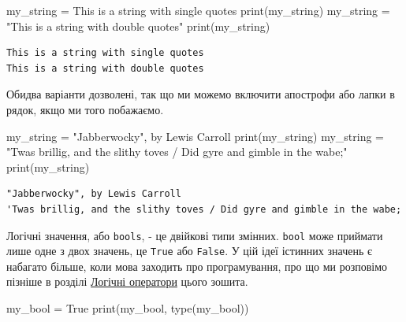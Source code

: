 \documentclass[
  letterpaper,
]{report}
\newenvironment{Shaded}{\begin{snugshade}}{\end{snugshade}}
\newcommand{\BuiltInTok}[1]{\textcolor[rgb]{0.00,0.23,0.31}{#1}}
\newcommand{\NormalTok}[1]{\textcolor[rgb]{0.00,0.23,0.31}{#1}}
\newcommand{\OperatorTok}[1]{\textcolor[rgb]{0.37,0.37,0.37}{#1}}
\newcommand{\StringTok}[1]{\textcolor[rgb]{0.13,0.47,0.30}{#1}}
\newcommand{\VariableTok}[1]{\textcolor[rgb]{0.07,0.07,0.07}{#1}}
\begin{document}
\begin{Shaded}
\begin{Highlighting}[]
\NormalTok{my\_string }\OperatorTok{=} \StringTok{\textquotesingle{}This is a string with single quotes\textquotesingle{}}
\BuiltInTok{print}\NormalTok{(my\_string)}
\NormalTok{my\_string }\OperatorTok{=} \StringTok{"This is a string with double quotes"}
\BuiltInTok{print}\NormalTok{(my\_string)}
\end{Highlighting}
\end{Shaded}

\begin{verbatim}
This is a string with single quotes
This is a string with double quotes
\end{verbatim}

Обидва варіанти дозволені, так що ми можемо включити апострофи або лапки
в рядок, якщо ми того побажаємо.

\begin{Shaded}
\begin{Highlighting}[]
\NormalTok{my\_string }\OperatorTok{=} \StringTok{\textquotesingle{}"Jabberwocky", by Lewis Carroll\textquotesingle{}}
\BuiltInTok{print}\NormalTok{(my\_string)}
\NormalTok{my\_string }\OperatorTok{=} \StringTok{"\textquotesingle{}Twas brillig, and the slithy toves / Did gyre and gimble in the wabe;"}
\BuiltInTok{print}\NormalTok{(my\_string)}
\end{Highlighting}
\end{Shaded}

\begin{verbatim}
"Jabberwocky", by Lewis Carroll
'Twas brillig, and the slithy toves / Did gyre and gimble in the wabe;
\end{verbatim}

Логічні значення, або \texttt{bools}, - це двійкові типи змінних.
\texttt{bool} може приймати лише одне з двох значень, це \texttt{True}
або \texttt{False}. У цій ідеї істинних значень є набагато більше, коли
мова заходить про програмування, про що ми розповімо пізніше в розділі
\protect\hyperlink{id-section5}{Логічні оператори} цього зошита.

\begin{Shaded}
\begin{Highlighting}[]
\NormalTok{my\_bool }\OperatorTok{=} \VariableTok{True}
\BuiltInTok{print}\NormalTok{(my\_bool, }\BuiltInTok{type}\NormalTok{(my\_bool))}
\end{Highlighting}
\end{Shaded}
\end{document}
